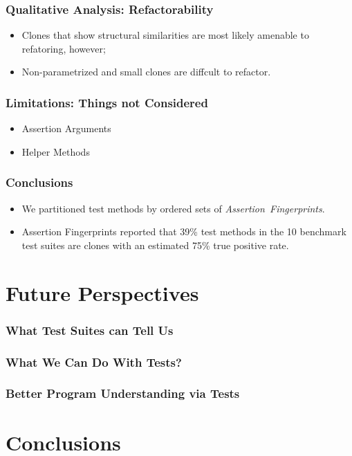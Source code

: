 \documentclass{beamer}
\begin{document}
\begin{frame}
\frametitle{Qualitative Analysis: Refactorability} {
   \Large
   \begin{itemize}
      \item Clones that show structural similarities are most likely amenable to
         refatoring, however;
         \vspace{0.5cm}
      \item Non-parametrized and small clones are diffcult to refactor.
   \end{itemize}    
}
\end{frame}

\begin{frame}
\frametitle{Limitations: Things not Considered} {
     \Large
     \begin{itemize}
        \item Assertion Arguments
           \vspace{0.5cm}
        \item Helper Methods
           \vspace{0.5cm}
     \end{itemize}    
   }
\end{frame}

\begin{frame}
  \frametitle{Conclusions} {
     \Large
     \begin{itemize}
        \item We partitioned test methods by ordered sets of \mbox{\em Assertion Fingerprints}.
           \vspace{0.5cm}
        \item Assertion Fingerprints reported that 39\% test methods in the 10 benchmark test suites are clones with an estimated 75\% true positive rate.
     \end{itemize}   
	}
\end{frame}


\section{Future Perspectives}

\begin{frame}
  \frametitle{What Test Suites can Tell Us}
\end{frame}

\begin{frame}
  \frametitle{What We Can Do With Tests?}
\end{frame}

\begin{frame}
  \frametitle{Better Program Understanding via Tests}
\end{frame}

\section{Conclusions}
\end{document}
